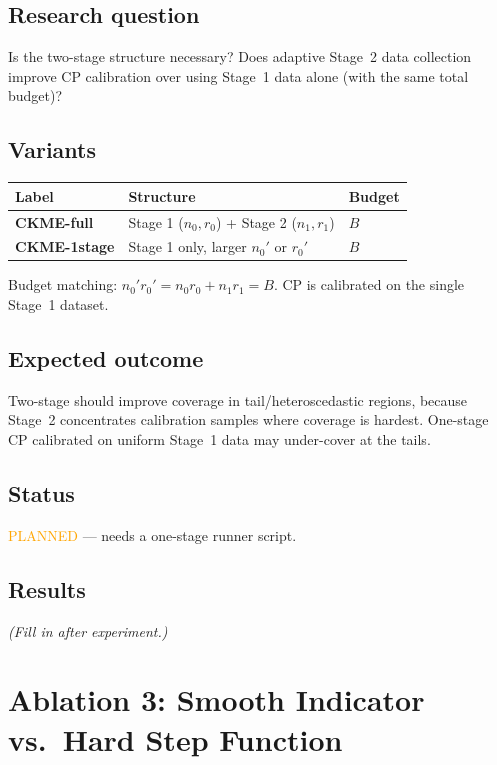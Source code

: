 \documentclass[11pt]{article}
\begin{document}
\subsection*{Research question}
Is the two-stage structure necessary?
Does adaptive Stage~2 data collection improve CP calibration
over using Stage~1 data alone (with the same total budget)?

\subsection*{Variants}

\begin{center}
\begin{tabular}{lll}
  \toprule
  Label & Structure & Budget \\
  \midrule
  \textbf{CKME-full} & Stage 1 ($n_0, r_0$) + Stage 2 ($n_1, r_1$) & $B$ \\
  \textbf{CKME-1stage} & Stage 1 only, larger $n_0'$ or $r_0'$ & $B$ \\
  \bottomrule
\end{tabular}
\end{center}

Budget matching: $n_0' r_0' = n_0 r_0 + n_1 r_1 = B$.
CP is calibrated on the single Stage~1 dataset.

\subsection*{Expected outcome}
Two-stage should improve coverage in tail/heteroscedastic regions,
because Stage~2 concentrates calibration samples where coverage is hardest.
One-stage CP calibrated on uniform Stage~1 data may under-cover at the tails.

\subsection*{Status}
\textcolor{orange}{PLANNED} --- needs a one-stage runner script.

\subsection*{Results}
\textit{(Fill in after experiment.)}

\section{Ablation 3: Smooth Indicator vs.\ Hard Step Function}
\label{sec:abl3}
\end{document}
